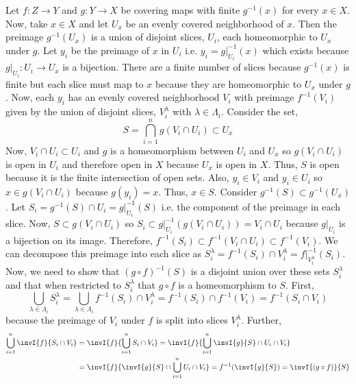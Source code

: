 \documentclass[12pt]{extarticle}
\begin{document}
Let $f : Z \to Y$ and $g : Y \to X$ be covering maps with finite $g^{-1}(x)$ for every $x \in X$. Now, take $x \in X$ and let $U_x$ be an evenly covered neighborhood of $x$. Then the preimage $g^{-1}(U_x)$ is a union of disjoint slices, $U_i$, each homeomorphic to $U_x$ under $g$. Let $y_i$ be the preimage of $x$ in $U_i$ i.e. $y_i = g|_{U_i}^{-1}(x)$ which exists because $g|_{U_i} : U_i \to U_x$ is a bijection. There are a finite number of slices because $g^{-1}(x)$ is finite but each slice must map to $x$ because they are homeomorphic to $U_x$ under $g$. Now, each $y_i$ has an evenly covered neighborhood $V_i$ with preimage $f^{-1}(V_i)$ given by the union of disjoint slices, $V_{i}^\lambda$ with $\lambda \in \Lambda_i$. Consider the set,
\[S = \bigcap_{i = 1}^n g(V_i \cap U_i) \subset U_x\] 
Now, $V_i \cap U_i \subset U_i$ and $g$ is a homeomorphism between $U_i$ and $U_x$ so $g(V_i \cap U_i)$ is open in $U_i$ and therefore open in $X$ because $U_x$ is open in $X$. Thus, $S$ is open because it is the finite intersection of open sets. Also, $y_i \in V_i$ and $y_i \in U_i$ so $x \in g(V_i \cap U_i)$ because $g(y_i) = x$. Thus, $x \in S$. Consider $g^{-1}(S) \subset g^{-1}(U_x)$. Let $S_i = g^{-1}(S) \cap U_i = g|_{U_i}^{-1}(S)$ i.e. the component of the preimage in each slice. Now, $S \subset g(V_i \cap U_i)$ so $S_i \subset g|_{U_i}^{-1}(g(V_i \cap U_i)) = V_i \cap U_i$ because $g|_{U_i}$ is a bijection on its image. Therefore, $f^{-1}(S_i) \subset f^{-1}(V_i \cap U_i) \subset f^{-1}(V_i)$. We can decompose this preimage into each slice as $S_{i}^\lambda = f^{-1}(S_i) \cap V_{i}^\lambda = f|_{V_{i}^\lambda}^{-1}(S_i)$. Now, we need to show that $(g \circ f)^{-1}(S)$ is a disjoint union over these sets $S_i^\lambda$ and that when restricted to $S_i^\lambda$ that $g \circ f$ is a homeomorphism to $S$. First, 
\[\bigcup_{\lambda \in \Lambda_i} S_i^\lambda = \bigcup_{\lambda \in \Lambda_i} f^{-1}(S_i) \cap V_{i}^\lambda = f^{-1}(S_i) \cap f^{-1}(V_i) = f^{-1}(S_i \cap V_i) \]
because the preimage of $V_i$ under $f$ is split into slices $V_i^\lambda$. Further,   
\begin{align*}
\bigcup_{i = 1}^n \invI{f}{S_i \cap V_i} &= \invI{f}{\bigcup_{i = 1}^n S_i \cap V_i} = \invI{f}{ \bigcup_{i = 1}^n \invI{g}{S} \cap U_i \cap V_i} \\ & = \invI{f}{\invI{g}{S} \cap \bigcup_{i = 1}^n U_i \cap V_i } = f^{-1}(\invI{g}{S}) = \invI{(g \circ f)}{S}
\end{align*}
\end{document}
